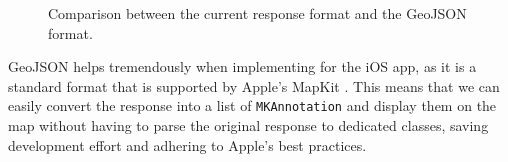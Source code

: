 \begin{figure}[H]
    \centering
    \hspace{0.5cm} %
    \hspace{0.5cm} %
    \caption{Comparison between the current response format and the GeoJSON format.}
\end{figure}

GeoJSON helps tremendously when implementing for the iOS app, as it is a standard format that is supported by Apple's MapKit \cite{mkgeojsonobject}. This means that we can easily convert the response into a list of \lstinline{MKAnnotation} and display them on the map without having to parse the original response to dedicated classes, saving development effort and adhering to Apple's best practices.